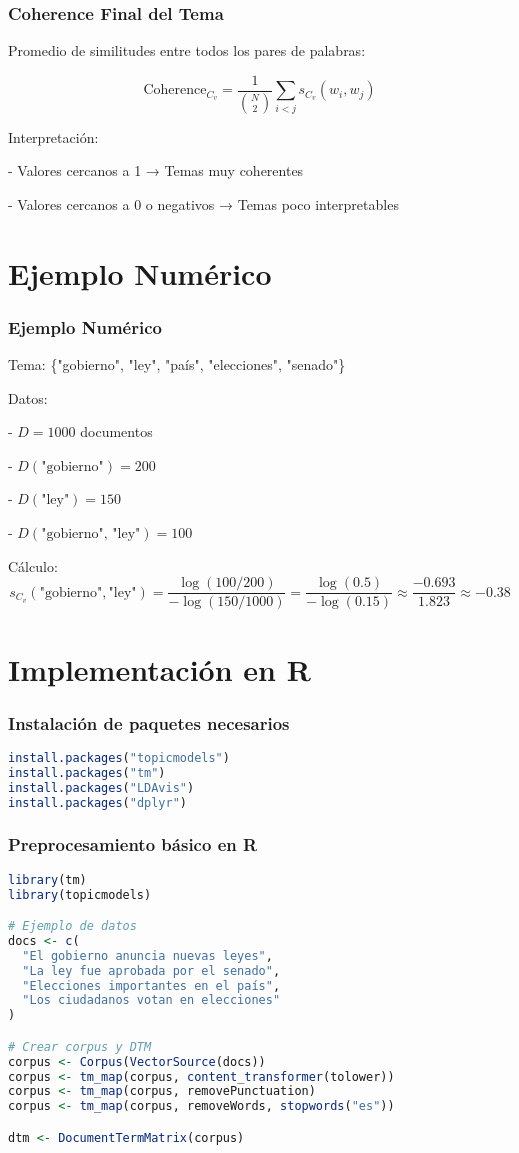 \documentclass[10pt]{beamer}
\begin{document}
\begin{frame}
\frametitle{Coherence Final del Tema}
Promedio de similitudes entre todos los pares de palabras:

$$
\text{Coherence}_{C_v} = \frac{1}{\binom{N}{2}} \sum_{i<j} s_{C_v}(w_i, w_j)
$$

Interpretación:

    
- Valores cercanos a 1 → Temas muy coherentes
    
- Valores cercanos a 0 o negativos → Temas poco interpretables

\end{frame}

\section{Ejemplo Numérico}
\begin{frame}
\frametitle{Ejemplo Numérico}
Tema: \{"gobierno", "ley", "país", "elecciones", "senado"\}

Datos:

    
- $ D = 1000 $ documentos
    
- $ D(\text{"gobierno"}) = 200 $
    
- $ D(\text{"ley"}) = 150 $
    
- $ D(\text{"gobierno", "ley"}) = 100 $


Cálculo:
$$
s_{C_v}(\text{"gobierno"}, \text{"ley"}) = \frac{\log(100/200)}{-\log(150/1000)} = \frac{\log(0.5)}{-\log(0.15)} \approx \frac{-0.693}{1.823} \approx -0.38
$$
\end{frame}

\section{Implementación en R}
\begin{frame}[fragile]
\frametitle{Instalación de paquetes necesarios}
\begin{lstlisting}[language=R]
install.packages("topicmodels")
install.packages("tm")
install.packages("LDAvis")
install.packages("dplyr")
\end{lstlisting}
\end{frame}

\begin{frame}[fragile]
\frametitle{Preprocesamiento básico en R}
\begin{lstlisting}[language=R]
library(tm)
library(topicmodels)

# Ejemplo de datos
docs <- c(
  "El gobierno anuncia nuevas leyes",
  "La ley fue aprobada por el senado",
  "Elecciones importantes en el país",
  "Los ciudadanos votan en elecciones"
)

# Crear corpus y DTM
corpus <- Corpus(VectorSource(docs))
corpus <- tm_map(corpus, content_transformer(tolower))
corpus <- tm_map(corpus, removePunctuation)
corpus <- tm_map(corpus, removeWords, stopwords("es"))

dtm <- DocumentTermMatrix(corpus)
\end{lstlisting}
\end{frame}
\end{document}

